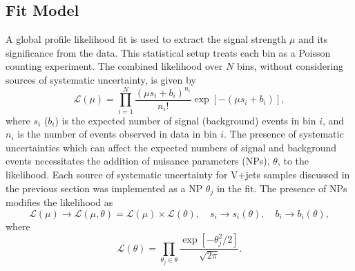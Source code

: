 \subsection{Fit Model}

A global profile likelihood fit is used to extract the signal strength $\mu$ and its significance from the data. This statistical setup treats each bin as a Poisson counting experiment. The combined likelihood over $N$ bins, without considering sources of systematic uncertainty, is given by
%
\begin{equation}
    \mathcal{L}(\mu) = \prod_{i=1}^N \frac{(\mu s_i + b_i)^{n_i}}{n_i!} \exp \left[ - (\mu s_i + b_i) \right],
\end{equation}
%
where $s_i$ ($b_i$) is the expected number of signal (background) events in bin $i$, and $n_i$ is the number of events observed in data in bin $i$. The presence of systematic uncertainties which can affect the expected numbers of signal and background events necessitates the addition of nuisance parameters (NPs), $\theta$, to the likelihood. Each source of systematic uncertainty for V+jets samples discussed in the previous section was implemented as a NP $\theta_j$ in the fit. The presence of NPs modifies the likelihood as 
%
\begin{equation}
    \mathcal{L}(\mu) \rightarrow \mathcal{L}(\mu, \theta) = \mathcal{L}(\mu) \times \mathcal{L}(\theta) , \quad s_i \rightarrow s_i(\theta) , \quad b_i \rightarrow b_i(\theta),
\end{equation}
%
where
%
\begin{equation}
    \mathcal{L}(\theta) = \prod_{\theta_j \in \theta} \frac{\exp\left[{-\theta_j^2/2}\right]}{\sqrt{2\pi}}.
\end{equation}
%


